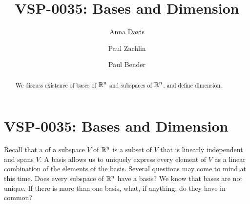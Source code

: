 \documentclass{ximera}
\author{Anna Davis \and Paul Zachlin \and Paul Bender} \title{VSP-0035: Bases and Dimension} \license{CC-BY-NC-SA}
\begin{document}
\begin{abstract}
We discuss existence of bases of $\mathbb{R}^n$ and subspaces of $\mathbb{R}^n$, and define dimension.
\end{abstract}
\maketitle

\section*{VSP-0035: Bases and Dimension}
Recall that a  of a subspace $V$ of $\mathbb{R}^n$ is a subset of $V$ that is linearly independent and spans $V$.  A basis allows us to uniquely express every element of $V$ as a linear combination of the elements of the basis.  Several questions may come to mind at this time.  Does every subspace of $\mathbb{R}^n$ have a basis?  We know that bases are not unique.  If there is more than one basis, what, if anything, do they have in common?
\end{document}
